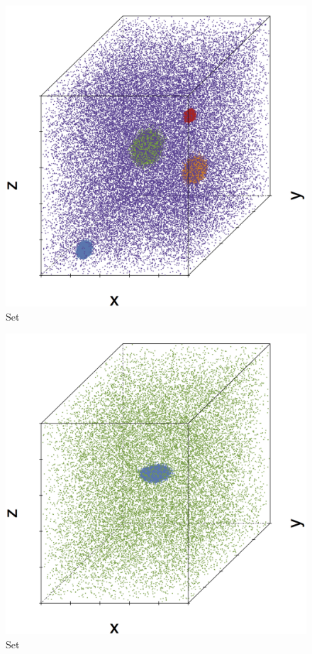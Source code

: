 \begin{subfigure}{0.3\textwidth}
	\centering
	\includegraphics[width=\textwidth]{3/img/datasetplot_ferdosi_3_120000.png}
	\caption{Set \ferdosiThree}
	\label{fig:3:simulated:datasets:ferdosi3}
\end{subfigure}		
\begin{subfigure}{0.3\textwidth}
	\centering
	\includegraphics[width=\textwidth]{3/img/datasetplot_baakman_1_60000.png}
	\caption{Set \baakmanOne}
	\label{fig:3:simulated:datasets:baakman1}
\end{subfigure}
